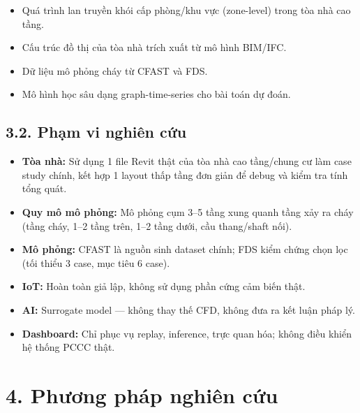 \begin{itemize}
  \item Quá trình lan truyền khói cấp phòng/khu vực (zone-level) trong tòa nhà cao tầng.
  \item Cấu trúc đồ thị của tòa nhà trích xuất từ mô hình BIM/IFC.
  \item Dữ liệu mô phỏng cháy từ CFAST và FDS.
  \item Mô hình học sâu dạng graph-time-series cho bài toán dự đoán.
\end{itemize}

\subsection*{3.2. Phạm vi nghiên cứu}

\begin{itemize}
  \item \textbf{Tòa nhà:} Sử dụng 1 file Revit thật của tòa nhà cao tầng/chung cư làm case study chính, kết hợp 1 layout thấp tầng đơn giản để debug và kiểm tra tính tổng quát.
  \item \textbf{Quy mô mô phỏng:} Mô phỏng cụm 3–5 tầng xung quanh tầng xảy ra cháy (tầng cháy, 1–2 tầng trên, 1–2 tầng dưới, cầu thang/shaft nối).
  \item \textbf{Mô phỏng:} CFAST là nguồn sinh dataset chính; FDS kiểm chứng chọn lọc (tối thiểu 3 case, mục tiêu 6 case).
  \item \textbf{IoT:} Hoàn toàn giả lập, không sử dụng phần cứng cảm biến thật.
  \item \textbf{AI:} Surrogate model — không thay thế CFD, không đưa ra kết luận pháp lý.
  \item \textbf{Dashboard:} Chỉ phục vụ replay, inference, trực quan hóa; không điều khiển hệ thống PCCC thật.
\end{itemize}

\section*{4. Phương pháp nghiên cứu}

